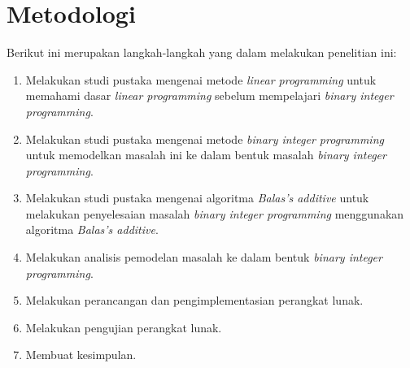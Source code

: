 \section{Metodologi}
\label{sec:metlit}
Berikut ini merupakan langkah-langkah yang dalam melakukan penelitian ini:
\begin{enumerate}
	\item Melakukan studi pustaka mengenai metode \textit{linear programming} untuk memahami dasar \textit{linear programming} sebelum mempelajari \textit{binary integer programming}.
	\item Melakukan studi pustaka mengenai metode \textit{binary integer programming} untuk memodelkan masalah ini ke dalam bentuk masalah \textit{binary integer programming}.
	\item Melakukan studi pustaka mengenai algoritma \textit{Balas's additive} untuk melakukan penyelesaian masalah \textit{binary integer programming} menggunakan algoritma \textit{Balas's additive}.
	\item Melakukan analisis pemodelan masalah ke dalam bentuk \textit{binary integer programming}.
	\item Melakukan perancangan dan pengimplementasian perangkat lunak.
	\item Melakukan pengujian perangkat lunak.
	\item Membuat kesimpulan.
\end{enumerate}

